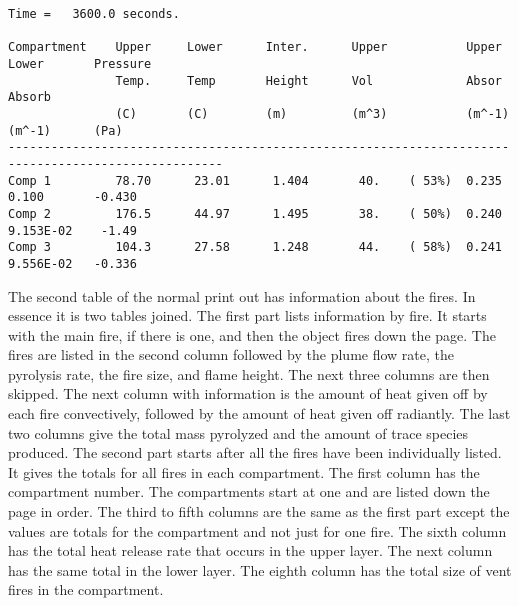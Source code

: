 \begin{lstlisting}[basicstyle=\tiny]
Time =   3600.0 seconds.

Compartment    Upper     Lower      Inter.      Upper           Upper      Lower       Pressure
               Temp.     Temp       Height      Vol             Absor      Absorb
               (C)       (C)        (m)         (m^3)           (m^-1)     (m^-1)      (Pa)
----------------------------------------------------------------------------------------------------
Comp 1         78.70      23.01      1.404       40.    ( 53%)  0.235      0.100       -0.430
Comp 2         176.5      44.97      1.495       38.    ( 50%)  0.240      9.153E-02    -1.49
Comp 3         104.3      27.58      1.248       44.    ( 58%)  0.241      9.556E-02   -0.336
\end{lstlisting}
The second table of the normal print out has information about the fires.  In essence it is two tables joined.  The first part lists information by fire.  It starts with the main fire, if there is one, and then the object fires down the page.  The fires are listed in the second column followed by the plume flow rate, the pyrolysis rate, the fire size, and flame height.  The next three columns are then skipped.  The next column with information is the amount of heat given off by each fire convectively, followed by the amount of heat given off radiantly. The last two columns give the total mass pyrolyzed and the amount of trace species produced.  The second part starts after all the fires have been individually listed.  It gives the totals for all fires in each compartment.  The first column has the compartment number.  The compartments start at one and are listed down the page in order.  The third to fifth columns are the same as the first part except the values are totals for the compartment and not just for one fire.  The sixth column has the total heat release rate that occurs in the upper layer.  The next column has the same total in the lower layer.  The eighth column has the total size of vent fires in the compartment.

